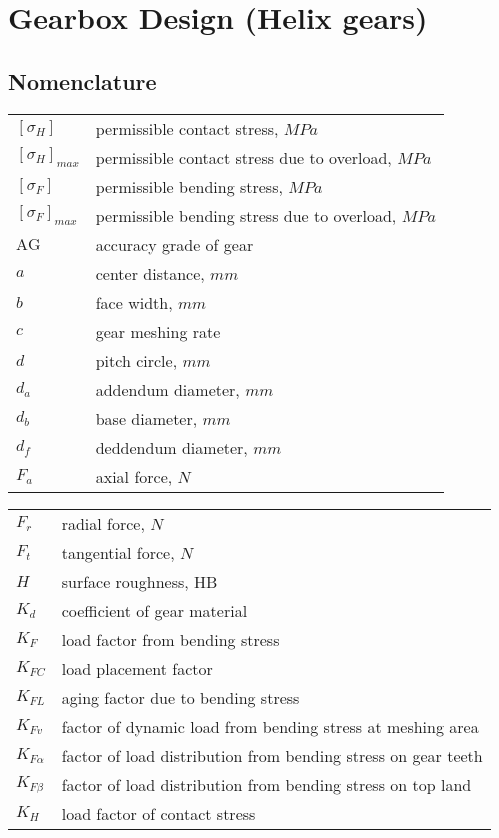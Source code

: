 \chapter{Gearbox Design (Helix gears)}
\section{Nomenclature}
	\begin{tabular}[t]{lp{6.5cm}}
		$ [\sigma_H] $ & permissible contact stress, $ \unit{MPa} $\\
		$ [\sigma_H]_{max} $ & permissible contact stress due to overload, $ \unit{MPa} $\\
		$ [\sigma_F] $ & permissible bending stress, $ \unit{MPa} $\\
		$ [\sigma_F]_{max} $ & permissible bending stress due to overload, $ \unit{MPa} $\\
		$ \text{AG} $ & accuracy grade of gear\\
		$ a $ & center distance, $ \unit{mm} $\\
		$ b $ & face width, $ \unit{mm} $\\
		$ c $ & gear meshing rate\\
		$ d $ & pitch circle, $ \unit{mm} $\\
		$ d_a $ & addendum diameter, $ \unit{mm} $\\
		$ d_b $ & base diameter, $ \unit{mm} $\\
		$ d_f $ & deddendum diameter, $ \unit{mm} $\\
		$ F_a $ & axial force, $ \unit{N} $\\
	\end{tabular}
	\begin{tabular}[t]{lp{6.5cm}}
		$ F_r $ & radial force, $ \unit{N} $\\
		$ F_t $ & tangential force, $ \unit{N} $\\
		$ H $ & surface roughness, HB\\
		$ K_d $ & coefficient of gear material\\	
		$ K_F $ & load factor from bending stress\\
		$ K_{FC} $ & load placement factor\\
		$ K_{FL} $ & aging factor due to bending stress\\
		$ K_{Fv} $ & factor of dynamic load from bending stress at meshing area\\
		$ K_{F\alpha} $ & factor of load distribution from bending stress on gear teeth\\
		$ K_{F\beta} $ & factor of load distribution from bending stress on top land\\
		$ K_H $ & load factor of contact stress\\
	\end{tabular}\newpage
